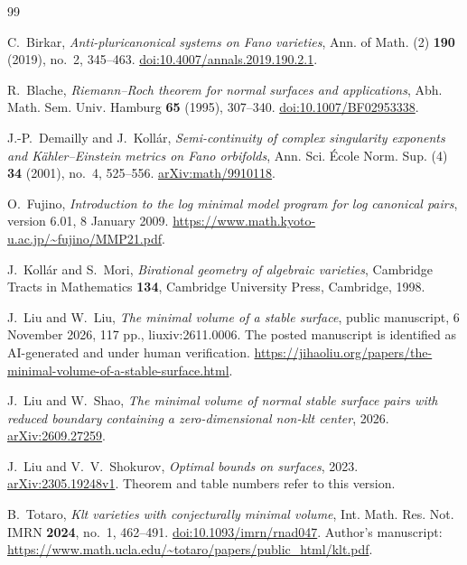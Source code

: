 \documentclass[12pt,a4paper]{article}
\numberwithin{equation}{section}
\theoremstyle{definition}
\begin{document}
{}
\begin{thebibliography}{99}

C.~Birkar,
\emph{Anti-pluricanonical systems on Fano varieties},
Ann. of Math. (2) \textbf{190} (2019), no.~2, 345--463.
\href{https://doi.org/10.4007/annals.2019.190.2.1}{doi:10.4007/annals.2019.190.2.1}.

R.~Blache,
\emph{Riemann--Roch theorem for normal surfaces and applications},
Abh. Math. Sem. Univ. Hamburg \textbf{65} (1995), 307--340.
\href{https://doi.org/10.1007/BF02953338}{doi:10.1007/BF02953338}.

J.-P.~Demailly and J.~Koll\'ar,
\emph{Semi-continuity of complex singularity exponents and
K\"ahler--Einstein metrics on Fano orbifolds},
Ann. Sci. \'Ecole Norm. Sup. (4) \textbf{34} (2001), no.~4, 525--556.
\href{https://arxiv.org/abs/math/9910118}{arXiv:math/9910118}.

O.~Fujino,
\emph{Introduction to the log minimal model program for log canonical
pairs}, version 6.01, 8 January 2009.
\url{https://www.math.kyoto-u.ac.jp/~fujino/MMP21.pdf}.

J.~Koll\'ar and S.~Mori,
\emph{Birational geometry of algebraic varieties},
Cambridge Tracts in Mathematics \textbf{134},
Cambridge University Press, Cambridge, 1998.

J.~Liu and W.~Liu,
\emph{The minimal volume of a stable surface},
public manuscript, 6 November 2026, 117 pp.,
liuxiv:2611.0006.
The posted manuscript is identified as AI-generated and under human
verification.
\url{https://jihaoliu.org/papers/the-minimal-volume-of-a-stable-surface.html}.

J.~Liu and W.~Shao,
\emph{The minimal volume of normal stable surface pairs with reduced
boundary containing a zero-dimensional non-klt center},
2026.
\href{https://arxiv.org/abs/2609.27259}{arXiv:2609.27259}.

J.~Liu and V.~V.~Shokurov,
\emph{Optimal bounds on surfaces},
2023.
\href{https://arxiv.org/abs/2305.19248v1}{arXiv:2305.19248v1}.
Theorem and table numbers refer to this version.

B.~Totaro,
\emph{Klt varieties with conjecturally minimal volume},
Int. Math. Res. Not. IMRN \textbf{2024}, no.~1, 462--491.
\href{https://doi.org/10.1093/imrn/rnad047}{doi:10.1093/imrn/rnad047}.
Author's manuscript:
\url{https://www.math.ucla.edu/~totaro/papers/public_html/klt.pdf}.

\end{thebibliography}
\end{document}
